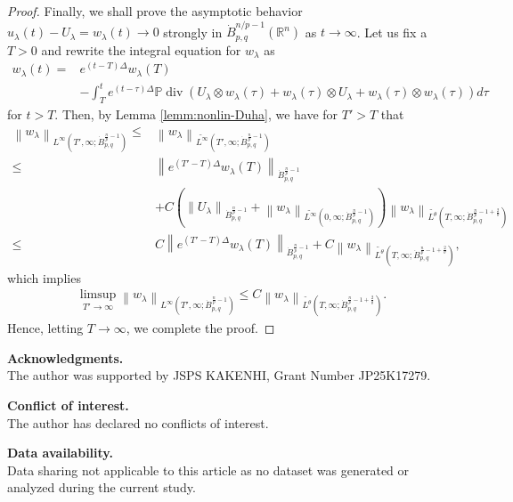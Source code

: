 \documentclass[a4paper,12pt,reqno]{amsart}
\theoremstyle{plain}
\theoremstyle{definition}
\renewcommand{\div}{\operatorname{div}}
\newcommand{\dB}{\dot{B}}
\renewcommand{\leq}{\leqslant}
\newcommand{\n}[1]{{\left\|#1\right\|}}
\newcommand{\R}{\mathbb{R}}
\renewcommand{\sp}[1]{\left(#1\right)}
\begin{document}
\begin{proof}
Finally, we shall prove the asymptotic behavior $u_{\lambda}(t)-U_{\lambda}=w_{\lambda}(t) \to 0$ strongly in $\dB_{p,q}^{n/p-1}(\R^n)$ as $t \to \infty$.
Let us fix a $T>0$ and rewrite the integral equation for $w_\lambda$ as 
\begin{align}
    w_{\lambda}(t)
    ={}&
    e^{(t-T)\Delta}w_{\lambda}(T)
    \\
    &
    -
    \int_T^t e^{(t-\tau)\Delta}\mathbb{P}\div\sp{U_{\lambda} \otimes w_{\lambda}(\tau) + w_{\lambda}(\tau) \otimes U_{\lambda} + w_{\lambda}(\tau) \otimes w_{\lambda}(\tau)}d\tau
\end{align}
for $t>T$.
Then, by Lemma \ref{lemm:nonlin-Duha}, we have for $T'>T$ that
\begin{align}
    \n{w_{\lambda}}_{L^{\infty}(T',\infty;\dB_{p,q}^{\frac{n}{p}-1})}
    \leq{}&
    \n{w_{\lambda}}_{\widetilde{L^{\infty}}(T',\infty;\dB_{p,q}^{\frac{n}{p}-1})}
    \\
    \leq{}&
    \n{e^{(T'-T)\Delta}w_{\lambda}(T)}_{\dB_{p,q}^{\frac{n}{p}-1}}
    \\
    &+
    C
    \sp{
    \n{U_{\lambda}}_{\dB_{p,q}^{\frac{n}{p}-1}}
    +
    \n{w_{\lambda}}_{\widetilde{L^{\infty}}(0,\infty;\dB_{p,q}^{\frac{n}{p}-1})}
    }
    \n{w_{\lambda}}_{\widetilde{L^{\theta}}(T,\infty;\dB_{p,q}^{\frac{n}{p}-1+\frac{2}{\theta}})}
    \\
    \leq{}&
    C
    \n{e^{(T'-T)\Delta}w_{\lambda}(T)}_{\dB_{p,q}^{\frac{n}{p}-1}}
    +
    C
    \n{w_{\lambda}}_{\widetilde{L^{\theta}}(T,\infty;\dB_{p,q}^{\frac{n}{p}-1+\frac{2}{\theta}})},
\end{align}
which implies
\begin{align}
    \limsup_{T' \to \infty}
    \n{w_{\lambda}}_{L^{\infty}(T',\infty;\dB_{p,q}^{\frac{n}{p}-1})}
    \leq 
    C
    \n{w_{\lambda}}_{\widetilde{L^{\theta}}(T,\infty;\dB_{p,q}^{\frac{n}{p}-1+\frac{2}{\theta}})}.
\end{align}
Hence, letting $T \to \infty$, we complete the proof.
\end{proof}



\noindent
{\bf Acknowledgments.} \\
The author was supported by JSPS KAKENHI, Grant Number JP25K17279. 

\noindent
{\bf Conflict of interest.} \\
The author has declared no conflicts of interest.

\noindent
{\bf Data availability.} \\
Data sharing not applicable to this article as no dataset was generated or analyzed during the current study.
\end{document}
